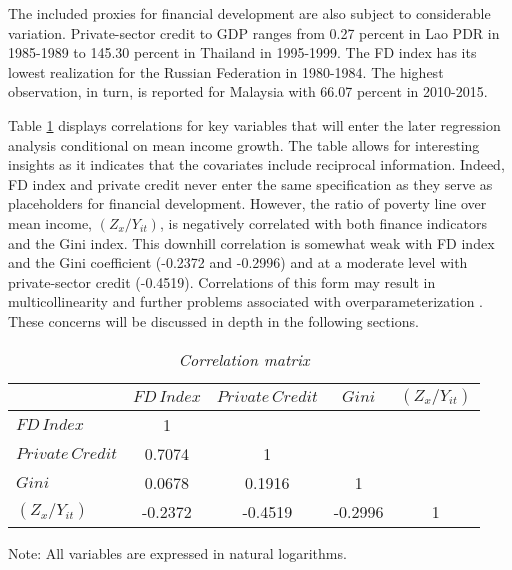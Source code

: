 \documentclass[12pt, a4paper]{article}
\begin{document}
The included proxies for financial development are also subject to considerable variation. Private-sector credit to GDP ranges from 0.27 percent in Lao PDR in 1985-1989 to 145.30 percent in Thailand in 1995-1999. The FD index has its lowest realization for the Russian Federation in 1980-1984. The highest observation, in turn, is reported for Malaysia with 66.07 percent in 2010-2015.

Table \ref{tab:Corr} displays correlations for key variables that will enter the later regression analysis conditional on mean income growth. The table allows for interesting insights as it indicates that the covariates include reciprocal information. Indeed, FD index and private credit never enter the same specification as they serve as placeholders for financial development. However, the ratio of poverty line over mean income, $(Z_{x}/Y_{it})$, is negatively correlated with both finance indicators and the Gini index. This downhill correlation is somewhat weak with FD index and the Gini coefficient (-0.2372 and -0.2996) and at a moderate level with private-sector credit (-0.4519). Correlations of this form may result in multicollinearity and further problems associated with overparameterization \cite{seven2016}. These concerns will be discussed in depth in the following sections.

\begin{table}[hb]
	\centering
	\begin{threeparttable}
		{
			\begin{tabular}{lcccc}
				\toprule
				& \multicolumn{1}{c}{$FD\,Index$} & \multicolumn{1}{c}{$Private\,Credit$} & \multicolumn{1}{c}{$Gini$} & \multicolumn{1}{c}{$(Z_{x}/Y_{it})$} \\
				\midrule
				$FD\,Index$ & 1     &       &       &  \\
				$Private\,Credit$ & 0.7074 & 1     &       &  \\
				$Gini$  & 0.0678 & 0.1916 & 1     &  \\
				$(Z_{x}/Y_{it})$ & -0.2372 & -0.4519 & -0.2996 & 1 \\
				\bottomrule
			\end{tabular}%
		}
		\begin{tablenotes}
			\item{Note: All variables are expressed in natural logarithms.}
		\end{tablenotes}
	\end{threeparttable}
		\caption[Correlation Matrix for Covariates]{\textit{Correlation matrix}}
		\label{tab:Corr}%
	\end{table}%
\end{document}
